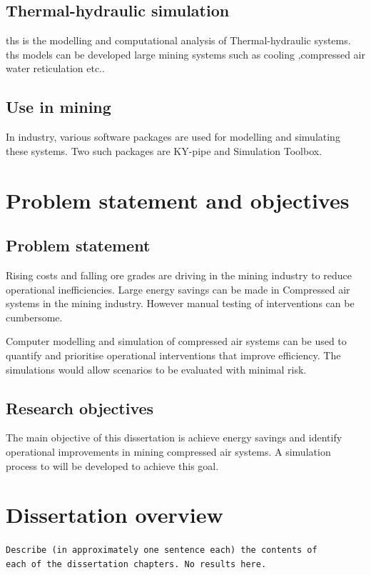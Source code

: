 	\subsection{Thermal-hydraulic simulation}
		\gls{ths} is the modelling and computational analysis of Thermal-hydraulic systems. \gls{ths} models can be developed large mining systems such as cooling ,compressed air water reticulation etc..
	\subsection{Use in mining}
		In industry, various software packages are used for modelling and simulating these systems. Two such packages are KY-pipe and Simulation Toolbox.
\section{Problem statement and objectives}
	\subsection{Problem statement}
 		Rising costs and falling ore grades are driving in the mining industry to reduce operational inefficiencies. Large energy savings can be made in Compressed air systems in the mining industry. However manual testing of interventions can be cumbersome.
 		\par
 		Computer modelling and simulation of compressed air systems can be used to quantify and prioritise operational interventions that improve efficiency. The simulations would allow scenarios to be evaluated with minimal risk.
	\subsection{Research objectives}
		The main objective of this dissertation is achieve energy savings and identify operational improvements in mining compressed air systems. A simulation process to will be developed to achieve this goal.
\section{Dissertation overview}
	\texttt{Describe (in approximately one sentence each) the contents of \\each of the dissertation chapters. No results here.}